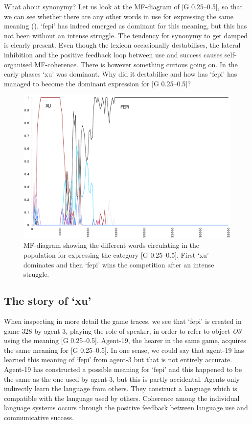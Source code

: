 What about synonymy? Let us look at the 
MF-diagram of [G 0.25–0.5], so that we can
see whether there are any other words in use for expressing
the same meaning ().
`fepi' has indeed emerged as dominant for this meaning, but 
this has not been without an intense struggle.
The tendency for synonymy to get damped is clearly present. 
Even though the lexicon occasionally destabilises, 
the lateral inhibition and the positive feedback loop between use 
and success causes self-organised MF-coherence. 
There is however something curious going on. 
In the early phases `xu' was dominant. Why did it 
destabilise and how has `fepi' has managed to become the
dominant expression for [G 0.25–0.5]? 

\begin{figure}[htbp]
  \centerline{\includegraphics[width=.80\textwidth]{chap7/figs/MF-G-025-050.pdf}}
\caption{\label{g02505.f}MF-diagram showing the
different words circulating in the population for expressing
the category [G 0.25–0.5]. First `xu' dominates and 
then `fepi' wins the competition after an intense struggle.}
\end{figure}

\subsection{The story of `xu'}

When inspecting in more detail the game traces,
we see that `fepi' is created in game 328 by agent-3, playing the
role of speaker, in order to refer to object \emph{O3} using 
the meaning [G 0.25–0.5]. Agent-19, the hearer in the same 
game, acquires the same meaning for [G 0.25–0.5]. In one sense,
we could say that agent-19 has learned this meaning of `fepi' from
agent-3 but that is not entirely accurate. Agent-19 
has constructed a possible meaning for `fepi' and this happened
to be the same as the one used by agent-3,
but this is partly accidental. 
Agents only indirectly learn the language from others. They construct
a language which is compatible with the language used by others. 
Coherence among the individual
language systems occurs through the positive feedback between
language use and communicative success.

